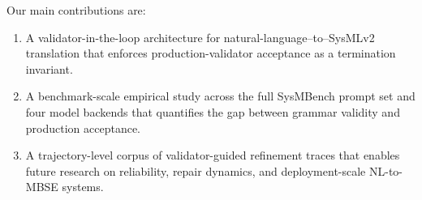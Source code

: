 \documentclass[colorlinks,upint,subscriptcorrection,varvw,hyphenate,balance]{asmeconf} %
\begin{document}
Our main contributions are:
\begin{enumerate}
    \item A validator-in-the-loop architecture for natural-language--to--SysMLv2 translation that enforces production-validator acceptance as a termination invariant.
    \item A benchmark-scale empirical study across the full SysMBench prompt set and four model backends that quantifies the gap between grammar validity and production acceptance.
    \item A trajectory-level corpus of validator-guided refinement traces that enables future research on reliability, repair dynamics, and deployment-scale NL-to-MBSE systems.
\end{enumerate}




\end{document}
